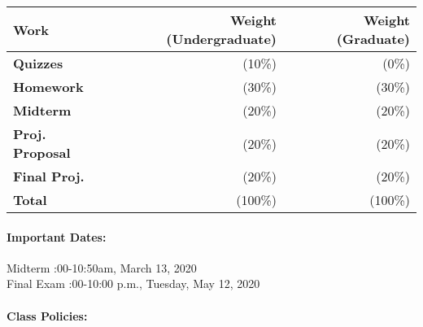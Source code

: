 \documentclass[11pt, a4paper]{article}
\begin{document}
\begin{table}[h]
\begin{tabularx}{\textwidth}{Xrr}
        \textbf{Work} & \textbf{Weight (Undergraduate)} & \textbf{Weight (Graduate)} \\
\hline
\textbf{Quizzes}         & (10\%)   & (0\%)\\
\textbf{Homework}        & (30\%)   & (30\%)\\
\textbf{Midterm}         & (20\%)   & (20\%)\\
\textbf{Proj. Proposal}  & (20\%)   & (20\%)\\
\textbf{Final Proj.}     & (20\%)   & (20\%)\\
\hline
\textbf{Total}           & (100\%) & (100\%)\\
\end{tabularx}
\end{table}

\paragraph{Important Dates:}
\begin{center} \begin{minipage}{3.8in}
\begin{flushleft}
Midterm      :00-10:50am, March 13, 2020\\
Final Exam       :00-10:00 p.m., Tuesday, May 12, 2020\\
\end{flushleft}
\end{minipage}
\end{center}



\paragraph{Class Policies:}
\end{document}

